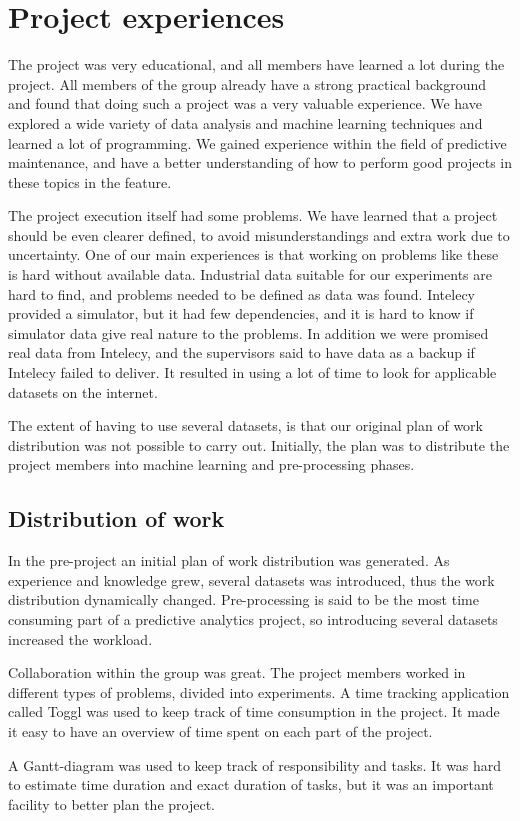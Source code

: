 \documentclass[english, a4paper]{report}
\begin{document}
{    \section{Project experiences}
    {
        The project was very educational, and all members have learned a lot during the project. All members of the group already have a strong practical background and found that doing such a project was a very valuable experience. We have explored a wide variety of data analysis and machine learning techniques and learned a lot of programming. We gained experience within the field of predictive maintenance, and have a better understanding of how to perform good projects in these topics in the feature. 
        \par
        The project execution itself had some problems. We have learned that a project should be even clearer defined, to avoid misunderstandings and extra work due to uncertainty. One of our main experiences is that working on problems like these is hard without available data. Industrial data suitable for our experiments are hard to find, and problems needed to be defined as data was found. Intelecy provided a simulator, but it had few dependencies, and it is hard to know if simulator data give real nature to the problems. In addition we were promised real data from Intelecy, and the supervisors said to have data as a backup if Intelecy failed to deliver. It resulted in using a lot of time to look for applicable datasets on the internet. 
        \par
        The extent of having to use several datasets, is that our original plan of work distribution was not possible to carry out. Initially, the plan was to distribute the project members into machine learning and pre-processing phases.
    
        \subsection{Distribution of work}
        {
            In the pre-project an initial plan of work distribution was generated. As experience and knowledge grew, several datasets was introduced, thus the work distribution dynamically changed. Pre-processing is said to be the most time consuming part of a predictive analytics project, so introducing several datasets increased the workload.
            \par 
            Collaboration within the group was great. The project members worked in different types of problems, divided into experiments. 
            A time tracking application called Toggl was used to keep track of time consumption in the project. It made it easy to have an overview of time spent on each part of the project.
            \par 
            A Gantt-diagram was used to keep track of responsibility and tasks. It was hard to estimate time duration and exact duration of tasks, but it was an important facility to better plan the project. 
        }
        
}}
\end{document}
